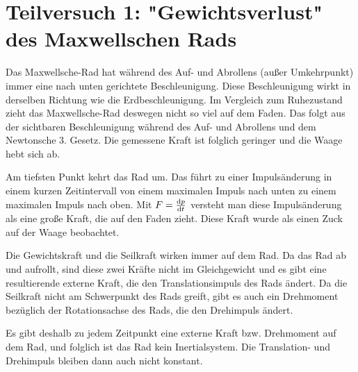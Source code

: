 \section{Teilversuch 1: "Gewichtsverlust" des Maxwellschen Rads}
    Das Maxwellsche-Rad hat während des Auf- und Abrollens (außer Umkehrpunkt) immer eine nach unten gerichtete Beschleunigung. Diese Beschleunigung wirkt in derselben Richtung wie die Erdbeschleunigung. Im Vergleich zum Ruhezustand zieht das Maxwellsche-Rad deswegen nicht so viel auf dem Faden. Das folgt aus der sichtbaren Beschleunigung während des Auf- und Abrollens und dem Newtonsche 3. Gesetz. Die gemessene Kraft ist folglich geringer und die Waage hebt sich ab. 

    Am tiefsten Punkt kehrt das Rad um. Das führt zu einer Impulsänderung in einem kurzen Zeitintervall von einem maximalen Impuls nach unten zu einem maximalen Impuls nach oben. Mit $F = \dv{p}{t}$ versteht man diese Impulsänderung als eine große Kraft, die auf den Faden zieht. Diese Kraft wurde als einen Zuck auf der Waage beobachtet. 

    Die Gewichtskraft und die Seilkraft wirken immer auf dem Rad. Da das Rad ab und aufrollt, sind diese zwei Kräfte nicht im Gleichgewicht und es gibt eine resultierende externe Kraft, die den Translationsimpuls des Rads ändert. Da die Seilkraft nicht am Schwerpunkt des Rads greift, gibt es auch ein Drehmoment bezüglich der Rotationsachse des Rads, die den Drehimpuls ändert. 

    Es gibt deshalb zu jedem Zeitpunkt eine externe Kraft bzw. Drehmoment auf dem Rad, und folglich ist das Rad kein Inertialsystem. Die Translation- und Drehimpuls bleiben dann auch nicht konstant. 